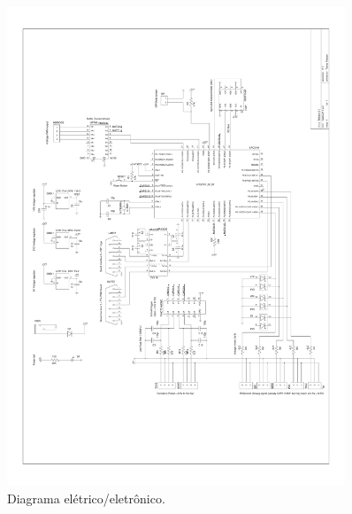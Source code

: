 \begin{figure}[H]
  \centering
  \includegraphics[width=0.9\textwidth, keepaspectratio]{./figuras/hardware/hardware2_2.pdf}
  \caption{Diagrama elétrico/eletrônico.}
  \label{fig:diagrama_eletrico_eletronico}
\end{figure}

